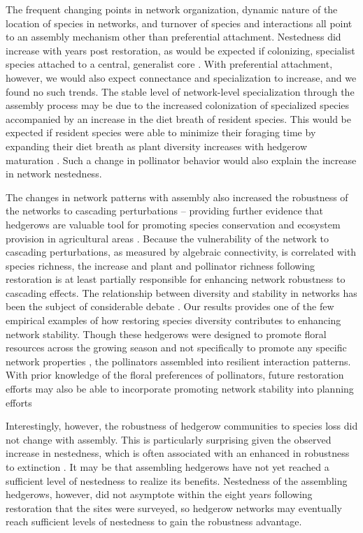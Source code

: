 \documentclass[12pt]{article}
\begin{document}
The frequent changing points in network organization, dynamic nature
of the location of species in networks, and turnover of species and
interactions all point to an assembly mechanism other than
preferential attachment. Nestedness did increase with years post
restoration, as would be expected if colonizing, specialist species
attached to a central, generalist core \cite{albrecht2010plant}. With
preferential attachment, however, we would also expect connectance and
specialization to increase, and we found no such trends. The stable
level of network-level specialization through the assembly process may
be due to the increased colonization of specialized species
\citep{mgonigle-2015-x} accompanied by an increase in the diet breath
of resident species. This would be expected if resident species were
able to minimize their foraging time by expanding their diet breath as
plant diversity increases with hedgerow maturation \citep{Waser1996,
  pyke1984optimal, Bluthgen2007, albrecht2010plant}. Such a change in
pollinator behavior would also explain the increase in network
nestedness.

The changes in network patterns with assembly also increased the
robustness of the networks to cascading perturbations -- providing
further evidence that hedgerows are valuable tool for promoting
species conservation and ecosystem provision in agricultural areas
\citep{mgonigle-2015-x, ponisio2015farm, kremen-2015-602}. Because the
vulnerability of the network to cascading perturbations, as measured by
algebraic connectivity, is correlated with species richness, the
increase and plant and pollinator richness following restoration is at
least partially responsible for enhancing network robustness to
cascading effects. The relationship between diversity and stability in
networks has been the subject of considerable debate
\citep[e.g.,][]{may1972will, pimm1984complexity,
  montoya2006ecological}. Our results provides one of the few
empirical examples of how restoring species diversity contributes to
enhancing network stability. Though these hedgerows were designed to
promote floral resources across the growing season and not
specifically to promote any specific network properties
\citep{menz-2010-4}, the pollinators assembled into resilient
interaction patterns. With prior knowledge of the floral preferences
of pollinators, future restoration efforts may also be able to
incorporate promoting network stability into planning efforts
\citep{mgonigle2016tool}

Interestingly, however, the robustness of hedgerow communities to
species loss did not change with assembly. This is particularly
surprising given the observed increase in nestedness, which is often
associated with an enhanced in robustness to extinction
\citep{Memmott2004}. It may be that assembling hedgerows have not yet
reached a sufficient level of nestedness to realize its
benefits. Nestedness of the assembling hedgerows, however, did not
asymptote within the eight years following restoration that the sites
were surveyed, so hedgerow networks may eventually reach sufficient
levels of nestedness to gain the robustness advantage.
\end{document}
